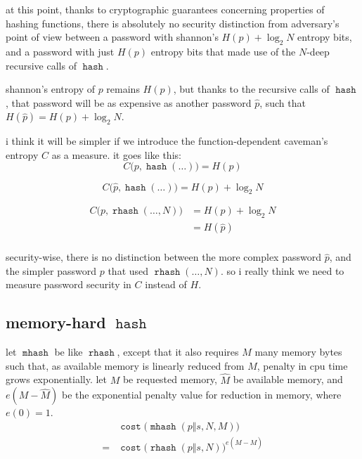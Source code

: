\documentclass[twocolumn]{article}
\DeclareMathOperator{\hash}{\mathtt{hash}}
\DeclareMathOperator{\rhash}{\mathtt{rhash}}
\DeclareMathOperator{\mhash}{\mathtt{mhash}}
\DeclareMathOperator{\cost}{\mathtt{cost}}
\begin{document}
at this point, thanks to cryptographic guarantees concerning properties of
hashing functions, there is absolutely no security distinction from
adversary's point of view between a password with shannon's $H(p) + \log_2
N$ entropy bits, and a password with just $H(p)$ entropy bits that made use
of the $N$-deep recursive calls of $\hash$.

shannon's entropy of $p$ remains $H(p)$, but thanks to the recursive calls
of $\hash$, that password will be as expensive as another password $\hat
p$, such that $H(\hat p) = H(p) + \log_2 N$.

i think it will be simpler if we introduce the function-dependent caveman's
entropy $C$ as a measure.  it goes like this:
\begin{equation}
    C\Big(p, \hash(\ldots)\Big) = H(p)
\end{equation}

\begin{equation}
    C\Big(\hat p, \hash(\ldots)\Big) = H(p) + \log_2 N
\end{equation}

\begin{equation}
    \begin{split}
        C\Big(p, \rhash(\ldots, N)\Big) &= H(p) + \log_2 N \\
                                &= H(\hat p) \\
    \end{split}
\end{equation}

security-wise, there is no distinction between the more complex password
$\hat p$, and the simpler password $p$ that used $\rhash(\ldots, N)$.  so i
really think we need to measure password security in $C$ instead of $H$.

\subsection{memory-hard $\hash$}
let $\mhash$ be like $\rhash$, except that it also requires $M$ many memory
bytes such that, as available memory is linearly reduced from $M$, penalty
in cpu time grows exponentially.  let $M$ be requested memory, $\hat M$ be
available memory, and $e(M - \hat M)$ be the exponential penalty value for
reduction in memory, where $e(0) = 1$.
\begin{equation}
    \begin{split}
        & \cost\Big(\mhash(p \Vert s, N, M)\Big) \\
    ={} & \cost\Big(\rhash(p \Vert s, N)\Big)^{e(\hat M - M)}
    \end{split}
\end{equation}
\end{document}

